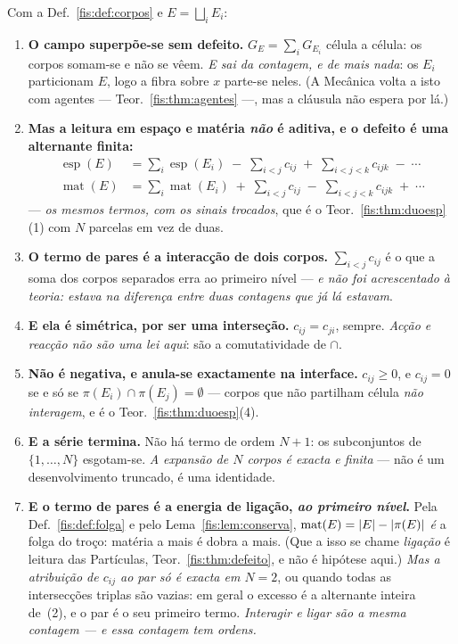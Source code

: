 \documentclass[livro.tex]{subfiles}
\begin{document}
\begin{teorema}\label{fis:thm:ncorpos}
Com a Def.~\ref{fis:def:corpos} e $E=\bigsqcup_i E_i$:
\begin{enumerate}\itemsep3pt
\item[(1)] \textbf{O campo superpõe-se sem defeito.} $G_E=\sum_i G_{E_i}$ célula
a célula: os corpos somam-se e não se vêem. \emph{E sai da contagem, e de mais
nada}: os $E_i$ particionam $E$, logo a fibra sobre $x$ parte-se neles.
(A Mecânica volta a isto com agentes --- Teor.~\ref{fis:thm:agentes} ---, mas a
cláusula não espera por lá.)
\item[(2)] \textbf{Mas a leitura em espaço e matéria \emph{não} é aditiva, e o
defeito é uma alternante finita:}
\[
\boxed{
\begin{aligned}
\operatorname{esp}(E)&=\sum_i\operatorname{esp}(E_i)\;-\;\sum_{i<j}c_{ij}\;+\;\sum_{i<j<k}c_{ijk}\;-\;\cdots\\
\operatorname{mat}(E)&=\sum_i\operatorname{mat}(E_i)\;+\;\sum_{i<j}c_{ij}\;-\;\sum_{i<j<k}c_{ijk}\;+\;\cdots
\end{aligned}}
\]
--- \emph{os mesmos termos, com os sinais trocados}, que é o
Teor.~\ref{fis:thm:duoesp}(1) com $N$ parcelas em vez de duas.
\item[(3)] \textbf{O termo de pares é a interacção de dois corpos.} $\sum_{i<j}c_{ij}$
é o que a soma dos corpos separados erra ao primeiro nível --- \emph{e não foi
acrescentado à teoria: estava na diferença entre duas contagens que já lá
estavam}.
\item[(4)] \textbf{E ela é simétrica, por ser uma interseção.} $c_{ij}=c_{ji}$,
sempre. \emph{Acção e reacção não são uma lei aqui}: são a comutatividade de
$\cap$.
\item[(5)] \textbf{Não é negativa, e anula-se exactamente na interface.}
$c_{ij}\ge0$, e $c_{ij}=0$ se e só se $\pi(E_i)\cap\pi(E_j)=\emptyset$ ---
corpos que não partilham célula \emph{não interagem}, e é o
Teor.~\ref{fis:thm:duoesp}(4).
\item[(6)] \textbf{E a série termina.} Não há termo de ordem $N+1$: os
subconjuntos de $\{1,\dots,N\}$ esgotam-se. \emph{A expansão de $N$ corpos é
exacta e finita} --- não é um desenvolvimento truncado, é uma identidade.
\item[(7)] \textbf{E o termo de pares é a energia de ligação, \emph{ao primeiro
nível}.} Pela Def.~\ref{fis:def:folga} e pelo Lema~\ref{fis:lem:conserva},
$\operatorname{mat}(E)=\lvert E\rvert-\lvert \pi(E)\rvert$ \emph{é} a folga do troço: matéria a
mais é dobra a mais. (Que a isso se chame \emph{ligação} é leitura das
Partículas, Teor.~\ref{fis:thm:defeito}, e não é hipótese aqui.) \emph{Mas a atribuição de $c_{ij}$ ao par só é exacta em $N=2$},
ou quando todas as intersecções triplas são vazias: em geral o excesso é a
alternante inteira de~(2), e o par é o seu primeiro termo. \emph{Interagir e
ligar são a mesma contagem --- e essa contagem tem ordens.}
\end{enumerate}
\end{teorema}
\end{document}
